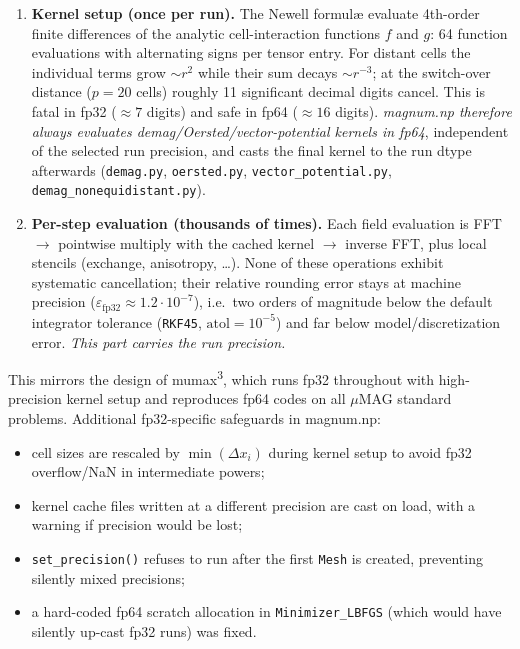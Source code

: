 \documentclass[11pt,a4paper]{article}
\newcommand{\magnumnp}{magnum.np}
\begin{document}
\begin{enumerate}
\item \textbf{Kernel setup (once per run).} The Newell formul\ae{} evaluate
      4th-order finite differences of the analytic cell-interaction functions
      $f$ and $g$: 64 function evaluations with alternating signs per tensor
      entry. For distant cells the individual terms grow $\sim r^2$ while their
      sum decays $\sim r^{-3}$; at the switch-over distance ($p=20$ cells)
      roughly 11 significant decimal digits cancel. This is fatal in fp32
      ($\approx 7$ digits) and safe in fp64 ($\approx 16$ digits).
      \emph{\magnumnp{} therefore always evaluates demag/Oersted/vector-potential
      kernels in fp64}, independent of the selected run precision, and casts the
      final kernel to the run dtype afterwards (\texttt{demag.py},
      \texttt{oersted.py}, \texttt{vector\_potential.py},
      \texttt{demag\_nonequidistant.py}).
\item \textbf{Per-step evaluation (thousands of times).} Each field evaluation
      is FFT $\rightarrow$ pointwise multiply with the cached kernel
      $\rightarrow$ inverse FFT, plus local stencils (exchange, anisotropy,
      \dots). None of these operations exhibit systematic cancellation; their
      relative rounding error stays at machine precision
      ($\varepsilon_{\mathrm{fp32}}\approx 1.2\cdot10^{-7}$), i.e.\ two orders of
      magnitude below the default integrator tolerance
      (\texttt{RKF45}, $\mathrm{atol}=10^{-5}$) and far below model/discretization
      error. \emph{This part carries the run precision.}
\end{enumerate}

This mirrors the design of mumax\textsuperscript{3}, which runs fp32 throughout
with high-precision kernel setup and reproduces fp64 codes on all $\mu$MAG
standard problems. Additional fp32-specific safeguards in \magnumnp{}:

\begin{itemize}
\item cell sizes are rescaled by $\min(\Delta x_i)$ during kernel setup to avoid
      fp32 overflow/NaN in intermediate powers;
\item kernel cache files written at a different precision are cast on load, with
      a warning if precision would be lost;
\item \texttt{set\_precision()} refuses to run after the first \texttt{Mesh} is
      created, preventing silently mixed precisions;
\item a hard-coded fp64 scratch allocation in \texttt{Minimizer\_LBFGS} (which
      would have silently up-cast fp32 runs) was fixed.
\end{itemize}
\end{document}
